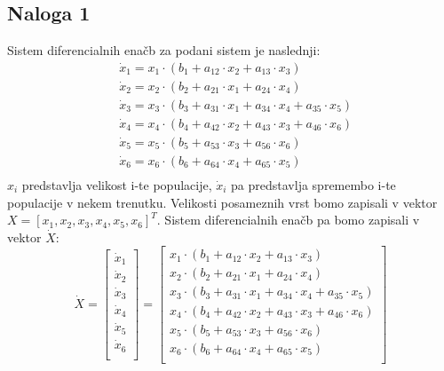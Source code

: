\documentclass[a4paper, 12pt]{article}
\begin{document}
\subsection{Naloga 1}
Sistem diferencialnih enačb za podani sistem je naslednji:
\begin{align*}
	&\dot x_{1} = x_{1}\cdot(b_{1}+a_{12}\cdot x_{2}+a_{13}\cdot x_{3}) \\
	&\dot x_{2} = x_{2}\cdot(b_{2}+a_{21}\cdot x_{1}+a_{24}\cdot x_{4}) \\
	&\dot x_{3} = x_{3}\cdot(b_{3}+a_{31}\cdot x_{1}+a_{34}\cdot x_{4}+a_{35}\cdot x_{5}) \\
	&\dot x_{4} = x_{4}\cdot(b_{4}+a_{42}\cdot x_{2}+a_{43}\cdot x_{3}+a_{46}\cdot x_{6}) \\
	&\dot x_{5} = x_{5}\cdot(b_{5}+a_{53}\cdot x_{3}+a_{56}\cdot x_{6}) \\
	&\dot x_{6} = x_{6}\cdot(b_{6}+a_{64}\cdot x_{4}+a_{65}\cdot x_{5}) \\
\end{align*}
$ x_{i} $ predstavlja velikost i-te populacije, $ \dot x_{i} $ pa predstavlja spremembo
i-te populacije v nekem trenutku. Velikosti posameznih vrst bomo zapisali v
vektor $ X = \left[x_{1}, x_{2}, x_{3}, x_{4}, x_{5}, x_{6}\right]^{T} $.
Sistem diferencialnih enačb pa bomo zapisali v vektor $ \dot X $:
\begin{equation}
	\dot X =
	\begin{bmatrix}
		\dot x_{1} \\
		\dot x_{2} \\
		\dot x_{3} \\
		\dot x_{4} \\
		\dot x_{5} \\
		\dot x_{6} \\
	\end{bmatrix}
	=
	\begin{bmatrix}
		x_{1}\cdot(b_{1}+a_{12}\cdot x_{2}+a_{13}\cdot x_{3}) \\
		x_{2}\cdot(b_{2}+a_{21}\cdot x_{1}+a_{24}\cdot x_{4}) \\
		x_{3}\cdot(b_{3}+a_{31}\cdot x_{1}+a_{34}\cdot x_{4}+a_{35}\cdot x_{5}) \\
		x_{4}\cdot(b_{4}+a_{42}\cdot x_{2}+a_{43}\cdot x_{3}+a_{46}\cdot x_{6}) \\
		x_{5}\cdot(b_{5}+a_{53}\cdot x_{3}+a_{56}\cdot x_{6}) \\
		x_{6}\cdot(b_{6}+a_{64}\cdot x_{4}+a_{65}\cdot x_{5}) \\
	\end{bmatrix}
\end{equation}
\end{document}
